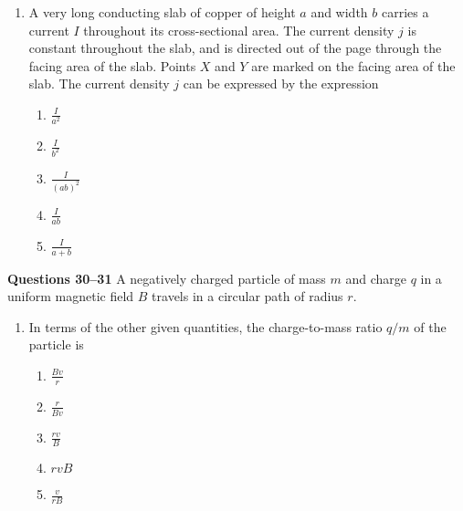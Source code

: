 \documentclass{../../../oss-apphys}
\begin{document}
\begin{multicols}{2}
\begin{enumerate}[leftmargin=18pt,resume]
  \item A very long conducting slab of copper of height $a$ and width $b$
    carries a current $I$ throughout its cross-sectional area. The current
    density $j$ is constant throughout the slab, and is directed out of the
    page through the facing area of the slab. Points $X$ and $Y$ are marked on
    the facing area of the slab. The current density $j$ can be expressed by
    the expression
    \begin{center}
    \end{center}
    \begin{enumerate}[noitemsep,topsep=0pt,leftmargin=18pt,label=(\Alph*)]
    \item $\displaystyle\frac{I}{a^2}$
    \item $\displaystyle\frac{I}{b^2}$
    \item $\displaystyle\frac{I}{(ab)^2}$
    \item $\displaystyle\frac{I}{ab}$
    \item $\displaystyle\frac{I}{a+b}$
    \end{enumerate}
  \end{enumerate}

  \columnbreak
  
  \textbf{Questions 30--31}
  A negatively charged particle of mass $m$ and charge $q$ in a uniform magnetic
  field $B$ travels in a circular path of radius $r$.
  \begin{center}
  \end{center}
  \begin{enumerate}[leftmargin=18pt,resume]
  \item In terms of the other given quantities, the charge-to-mass ratio $q/m$
    of the particle is
    \begin{enumerate}[noitemsep,topsep=0pt,leftmargin=18pt,label=(\Alph*)]
    \item $\displaystyle\frac{Bv}{r}$
    \item $\displaystyle\frac{r}{Bv}$
    \item $\displaystyle\frac{rv}{B}$
    \item $rvB$
    \item $\displaystyle\frac{v}{rB}$
    \end{enumerate}


\end{enumerate}
\end{multicols}
\end{document}
